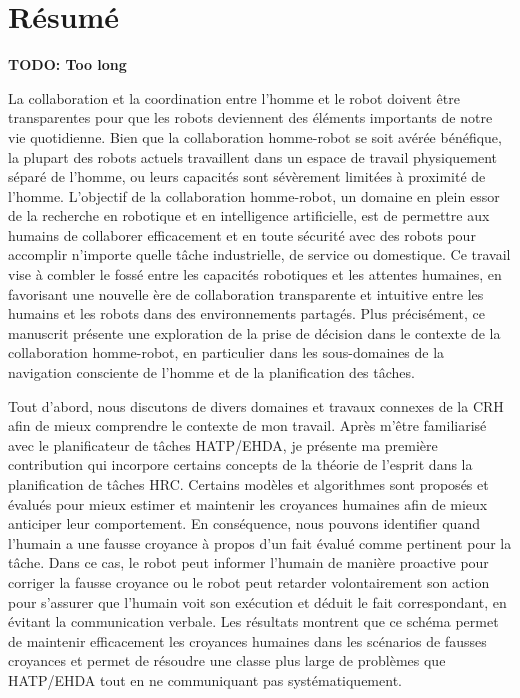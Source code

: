 \chapter*{Résumé}

\textbf{TODO: Too long}

La collaboration et la coordination entre l'homme et le robot doivent être transparentes pour que les robots deviennent des éléments importants de notre vie quotidienne. 
Bien que la collaboration homme-robot se soit avérée bénéfique, la plupart des robots actuels travaillent dans un espace de travail physiquement séparé de l'homme, ou leurs capacités sont sévèrement limitées à proximité de l'homme.
L'objectif de la collaboration homme-robot, un domaine en plein essor de la recherche en robotique et en intelligence artificielle, est de permettre aux humains de collaborer efficacement et en toute sécurité avec des robots pour accomplir n'importe quelle tâche industrielle, de service ou domestique.
Ce travail vise à combler le fossé entre les capacités robotiques et les attentes humaines, en favorisant une nouvelle ère de collaboration transparente et intuitive entre les humains et les robots dans des environnements partagés. Plus précisément, ce manuscrit présente une exploration de la prise de décision dans le contexte de la collaboration homme-robot, en particulier dans les sous-domaines de la navigation consciente de l'homme et de la planification des tâches.

Tout d'abord, nous discutons de divers domaines et travaux connexes de la CRH afin de mieux comprendre le contexte de mon travail. 
Après m'être familiarisé avec le planificateur de tâches HATP/EHDA, je présente ma première contribution qui incorpore certains concepts de la théorie de l'esprit dans la planification de tâches HRC. Certains modèles et algorithmes sont proposés et évalués pour mieux estimer et maintenir les croyances humaines afin de mieux anticiper leur comportement. En conséquence, nous pouvons identifier quand l'humain a une fausse croyance à propos d'un fait évalué comme pertinent pour la tâche. Dans ce cas, le robot peut informer l'humain de manière proactive pour corriger la fausse croyance ou le robot peut retarder volontairement son action pour s'assurer que l'humain voit son exécution et déduit le fait correspondant, en évitant la communication verbale. Les résultats montrent que ce schéma permet de maintenir efficacement les croyances humaines dans les scénarios de fausses croyances et permet de résoudre une classe plus large de problèmes que HATP/EHDA tout en ne communiquant pas systématiquement.


